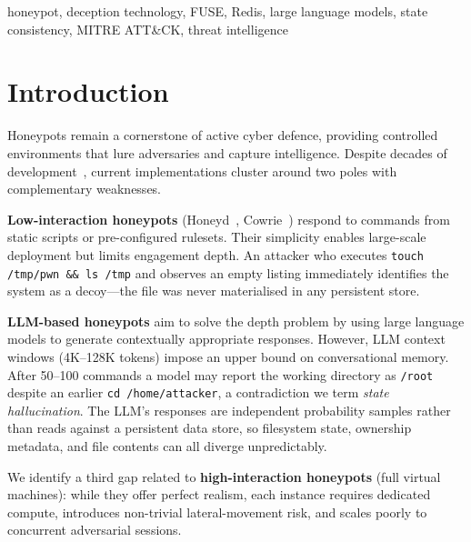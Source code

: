\documentclass[conference]{IEEEtran}
\begin{document}
\begin{IEEEkeywords}
honeypot, deception technology, FUSE, Redis, large language models, state consistency, MITRE ATT\&CK, threat intelligence
\end{IEEEkeywords}

\section{Introduction}
\label{sec:introduction}

Honeypots remain a cornerstone of active cyber defence, providing controlled environments that lure adversaries and capture intelligence.
Despite decades of development~\cite{stoll1988cuckoo, spitzner2003honeypots}, current implementations cluster around two poles with complementary weaknesses.

\textbf{Low-interaction honeypots} (Honeyd~\cite{provos2003virtual}, Cowrie~\cite{cowrie2019}) respond to commands from static scripts or pre-configured rulesets.
Their simplicity enables large-scale deployment but limits engagement depth.
An attacker who executes \texttt{touch /tmp/pwn \&\& ls /tmp} and observes an empty listing immediately identifies the system as a decoy---the file was never materialised in any persistent store.

\textbf{LLM-based honeypots} aim to solve the depth problem by using large language models to generate contextually appropriate responses.
However, LLM context windows (4K--128K tokens) impose an upper bound on conversational memory.
After 50--100 commands a model may report the working directory as \texttt{/root} despite an earlier \texttt{cd /home/attacker}, a contradiction we term \emph{state hallucination}.
The LLM's responses are independent probability samples rather than reads against a persistent data store, so filesystem state, ownership metadata, and file contents can all diverge unpredictably.

We identify a third gap related to \textbf{high-interaction honeypots} (full virtual machines): while they offer perfect realism, each instance requires dedicated compute, introduces non-trivial lateral-movement risk, and scales poorly to concurrent adversarial sessions.
\end{document}

